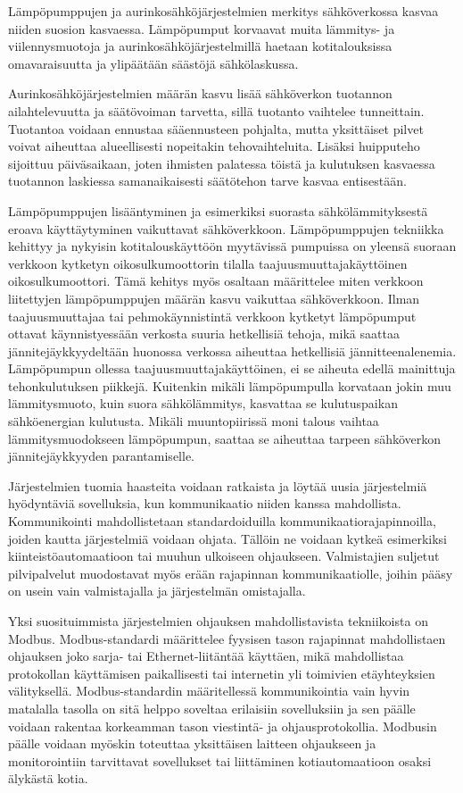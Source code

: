 Lämpöpumppujen ja aurinkosähköjärjestelmien merkitys sähköverkossa kasvaa niiden suosion kasvaessa. Lämpöpumput korvaavat muita lämmitys- ja viilennysmuotoja ja aurinkosähköjärjestelmillä haetaan kotitalouksissa omavaraisuutta ja ylipäätään säästöjä sähkölaskussa.

Aurinkosähköjärjestelmien määrän kasvu lisää sähköverkon tuotannon ailahtelevuutta ja säätövoiman tarvetta, sillä tuotanto vaihtelee tunneittain. Tuotantoa voidaan ennustaa sääennusteen pohjalta, mutta yksittäiset pilvet voivat aiheuttaa alueellisesti nopeitakin tehovaihteluita. Lisäksi huipputeho sijoittuu päiväsaikaan, joten ihmisten palatessa töistä ja kulutuksen kasvaessa tuotannon laskiessa samanaikaisesti säätötehon tarve kasvaa entisestään.

Lämpöpumppujen lisääntyminen ja esimerkiksi suorasta sähkölämmityksestä eroava käyttäytyminen vaikuttavat sähköverkkoon. Lämpöpumppujen tekniikka kehittyy ja nykyisin kotitalouskäyttöön myytävissä pumpuissa on yleensä suoraan verkkoon kytketyn oikosulkumoottorin tilalla taajuusmuuttajakäyttöinen oikosulkumoottori. Tämä kehitys myös osaltaan määrittelee miten verkkoon liitettyjen lämpöpumppujen määrän kasvu vaikuttaa sähköverkkoon. Ilman taajuusmuuttajaa tai pehmokäynnistintä verkkoon kytketyt lämpöpumput ottavat käynnistyessään verkosta suuria hetkellisiä tehoja, mikä saattaa jännitejäykkyydeltään huonossa verkossa aiheuttaa hetkellisiä jännitteenalenemia. Lämpöpumpun ollessa taajuusmuuttajakäyttöinen, ei se aiheuta edellä mainittuja tehonkulutuksen piikkejä. Kuitenkin mikäli lämpöpumpulla korvataan jokin muu lämmitysmuoto, kuin suora sähkölämmitys, kasvattaa se kulutuspaikan sähköenergian kulutusta. Mikäli muuntopiirissä moni talous vaihtaa lämmitysmuodokseen lämpöpumpun, saattaa se aiheuttaa tarpeen sähköverkon jännitejäykkyyden parantamiselle.

Järjestelmien tuomia haasteita voidaan ratkaista ja löytää uusia järjestelmiä hyödyntäviä sovelluksia, kun kommunikaatio niiden kanssa mahdollista. Kommunikointi mahdollistetaan standardoiduilla kommunikaatiorajapinnoilla, joiden kautta järjestelmiä voidaan ohjata. Tällöin ne voidaan kytkeä esimerkiksi kiinteistöautomaatioon tai muuhun ulkoiseen ohjaukseen. Valmistajien suljetut pilvipalvelut muodostavat myös erään rajapinnan kommunikaatiolle, joihin pääsy on usein vain valmistajalla ja järjestelmän omistajalla.

Yksi suosituimmista järjestelmien ohjauksen mahdollistavista tekniikoista on Modbus. Modbus-standardi määrittelee fyysisen tason rajapinnat mahdollistaen ohjauksen joko sarja- tai Ethernet-liitäntää käyttäen, mikä mahdollistaa protokollan käyttämisen paikallisesti tai internetin yli toimivien etäyhteyksien välityksellä. Modbus-standardin määritellessä kommunikointia vain hyvin matalalla tasolla on sitä helppo soveltaa erilaisiin sovelluksiin ja sen päälle voidaan rakentaa korkeamman tason viestintä- ja ohjausprotokollia. Modbusin päälle voidaan myöskin toteuttaa yksittäisen laitteen ohjaukseen ja monitorointiin tarvittavat sovellukset tai liittäminen kotiautomaatioon osaksi älykästä kotia.

